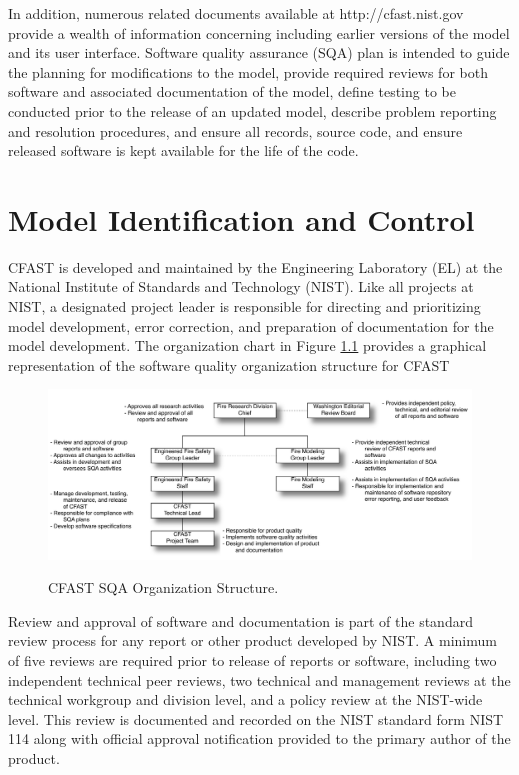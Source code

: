 \documentclass[12pt]{book}
\begin{document}
In addition, numerous related documents available at http://cfast.nist.gov provide a wealth of information concerning including earlier versions of the model and its user interface. Software quality assurance (SQA) plan is intended to guide the planning for modifications to the model, provide required reviews for both software and associated documentation of the model, define testing to be conducted prior to the release of an updated model, describe problem reporting and resolution procedures, and ensure all records, source code, and ensure released software is kept available for the life of the code.

\chapter{Model Identification and Control}

CFAST is developed and maintained by the Engineering Laboratory (EL) at the National Institute of Standards and Technology (NIST). Like all projects at NIST, a designated project leader is responsible for directing and prioritizing model development, error correction, and preparation of documentation for the model development.  The organization chart in Figure \ref{figOrgChart} provides a graphical representation of the software quality organization structure for CFAST

\begin{figure}
\begin{center}
\includegraphics[width=6.5in]{FIGURES/OrgChart.pdf}\\
\end{center}
\caption{CFAST SQA Organization Structure.}
 \label{figOrgChart}
\end{figure}

Review and approval of software and documentation is part of the standard review process for any report or other product developed by NIST. A minimum of five reviews are required prior to release of reports or software, including two independent technical peer reviews, two technical and management reviews at the technical workgroup and division level, and a policy review at the NIST-wide level.  This review is documented and recorded on the NIST standard form NIST 114 along with official approval notification provided to the primary author of the product.
\end{document}
